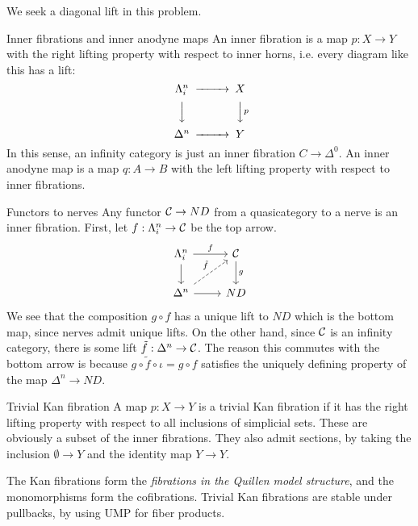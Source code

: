 We seek a diagonal lift in this problem. 

\begin{definition}{Inner fibrations and inner anodyne maps}{}
 An inner fibration is a map $p:X\rightarrow Y$ with the right lifting property with respect to inner horns, i.e. every diagram like this has a lift: $$\begin{CD}\Lambda^n_i @>>>X \\ @VVV @VVpV \\ \Delta^n @>>> Y\end{CD}$$
 In this sense, an infinity category is just an inner fibration $C\rightarrow \Delta^0$. An inner anodyne map is a map $q:A\rightarrow B$ with the left lifting property with respect to inner fibrations.
\end{definition}

\begin{example}{Functors to nerves}{}
    Any functor $\mathcal{C} \rightarrow ND$ from a quasicategory to a nerve is an inner fibration. First, let $f:\Lambda^n_i\rightarrow \mathcal{C}$ be the top arrow. \[\begin{tikzcd}
        {\Lambda^n_i} & \calC \\
        {\Delta^n} & ND
        \arrow["f", from=1-1, to=1-2]
        \arrow[from=1-1, to=2-1]
        \arrow["g", from=1-2, to=2-2]
        \arrow["{\tilde{f}}", dashed, from=2-1, to=1-2]
        \arrow[from=2-1, to=2-2]
    \end{tikzcd}\]
    We see that the composition $g\circ f$ has a unique lift to $ND$ which is the bottom map, since nerves admit unique lifts. On the other hand, since $\mathcal{C}$ is an infinity category, there is some lift $\tilde{f}:\Delta^n \rightarrow \mathcal{C}$. The reason this commutes with the bottom arrow is because $g\circ\tilde{f}\circ \iota = g\circ f$ satisfies the uniquely defining property of the map $\Delta^n\rightarrow ND$. 
    
\end{example}

\begin{definition}{Trivial Kan fibration}{}
    A map $p:X\rightarrow Y$ is a trivial Kan fibration if it has the right lifting property with respect to all inclusions of simplicial sets. These are obviously a subset of the inner fibrations. They also admit sections, by taking the inclusion $\emptyset \rightarrow Y$ and the identity map $Y\rightarrow Y$. 
\end{definition}

The Kan fibrations form the \emph{fibrations in the Quillen model structure}, and the monomorphisms form the cofibrations. Trivial Kan fibrations are stable under pullbacks, by using UMP for fiber products. 

